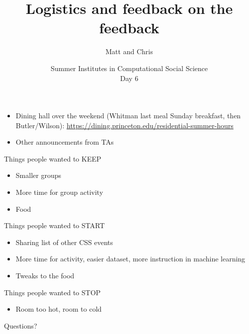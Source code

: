 \documentclass{beamer}
\title[]{Logistics and feedback on the feedback}
\author[]{Matt and Chris}
\date[]{Summer Institutes in Computational Social Science\\Day 6
}
\begin{document}
\frame{\titlepage}
\begin{frame}

\begin{itemize}
\item Dining hall over the weekend (Whitman last meal Sunday breakfast, then Butler/Wilson):  \url{https://dining.princeton.edu/residential-summer-hours}
\pause
\item Other announcements from TAs
\end{itemize}

\end{frame}
\begin{frame}

Things people wanted to KEEP
\begin{itemize}
\item Smaller groups 
\item More time for group activity
\item Food
\end{itemize}

\end{frame}
\begin{frame}

Things people wanted to START
\begin{itemize}
\item Sharing list of other CSS events
\pause
\item More time for activity, easier dataset, more instruction in machine learning
\pause
\item Tweaks to the food
\end{itemize}

\end{frame}
\begin{frame}

Things people wanted to STOP
\begin{itemize}
\item Room too hot, room to cold
\end{itemize}

\end{frame}
\begin{frame}

\begin{center}
\LARGE
Questions?
\end{center}

\end{frame}
\end{document}
